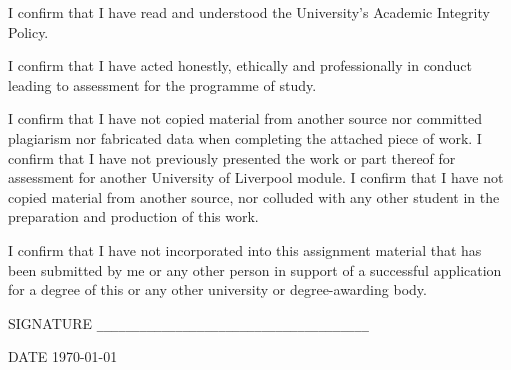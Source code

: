 \documentclass[a4paper,11pt]{report}
\begin{document}
I confirm that I have read and understood the University's Academic Integrity Policy.

I confirm that I have acted honestly, ethically and professionally in conduct leading
to assessment for the programme of study.  

I confirm that I have not copied material from another source nor committed plagiarism
nor fabricated data when completing the attached piece of work.  I confirm that I have 
not previously presented the work or part thereof for assessment for another University
of Liverpool module.  I confirm that I have not copied material from another source, nor
colluded with any other student in the preparation and production of this work.  

I confirm that I have not incorporated into this assignment material that has been 
submitted by me or any other person in support of a successful application for a 
degree of this or any other university or degree-awarding body.  

\vspace*{1in}

\noindent SIGNATURE \verb!______________________________________!

\noindent DATE \hspace*{.4in}  \today

\vspace*{1in}




\newpage

\end{document}
